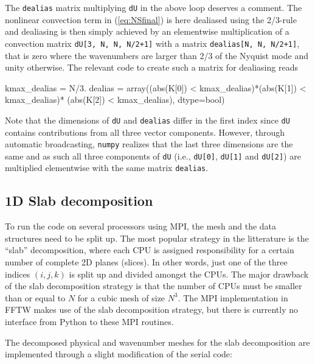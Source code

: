 \documentclass[final,1p,times]{elsarticle}
\newcommand{\inpyth}{\lstinline[style=inlinestyle]} %[]%
\begin{document}
The \inpyth{dealias} matrix multiplying \inpyth{dU} in the above
loop deserves a comment.
The nonlinear convection term in (\ref{eq:NSfinal}) is here dealiased using the 2/3-rule \cite{orzag71} and dealiasing is then simply achieved by an elementwise multiplication of a convection matrix \inpyth{dU[3, N, N, N/2+1]} with a matrix \inpyth{dealias[N, N, N/2+1]}, that is zero where the wavenumbers are larger than 2/3 of the Nyquist mode and unity otherwise. The relevant code to create such a matrix for dealiasing reads

\begin{python}
kmax_dealias = N/3.
dealias = array((abs(K[0]) < kmax_dealias)*(abs(K[1]) < kmax_dealias)*
                (abs(K[2]) < kmax_dealias), dtype=bool)
\end{python}
Note that the dimensions of \inpyth{dU} and \inpyth{dealias} differ in the first index since \inpyth{dU} contains contributions from all three vector components. However, through automatic broadcasting, \texttt{numpy} realizes that the last three dimensions are the same and as such all three components of \inpyth{dU} (i.e.,  \inpyth{dU[0]}, \inpyth{dU[1]} and  \inpyth{dU[2]}) are multiplied elementwise with the same matrix \inpyth{dealias}.

\subsection{1D Slab decomposition}
\label{slab1D}

To run the code on several processors using MPI, the mesh and the data structures need to be split up. The most popular strategy in the litterature is the ``slab'' decomposition, where each CPU is assigned responsibility for a certain number of complete 2D planes (slices). In other words, just one of the three indices $(i,j,k)$ is split up and divided amongst the CPUs. The major drawback of the slab decomposition strategy is that the number of CPUs must be smaller than or equal to $N$ for a cubic mesh of size $N^3$. The MPI implementation in FFTW makes use of the slab decomposition strategy, but there is currently no interface from Python to these MPI routines.

The decomposed physical and wavenumber meshes for the slab decomposition are implemented through a slight modification of the serial code:
\end{document}
